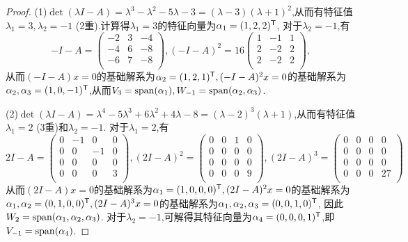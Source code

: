 \documentclass[11pt]{article}
\begin{document}
\begin{proof}
    (1)$\det(\lambda I-A)=\lambda^3-\lambda^2-5 \lambda-3=(\lambda-3) (\lambda+1)^2$,从而有特征值$\lambda_1=3, \lambda_2=-1$ (2重).计算得$\lambda_1=3$的特征向量为$\alpha_1=(1,2,2)^{\mathsf{T}}$, 对于$\lambda_2=-1$,有
    $$-I-A=\begin{pmatrix} 
        -2 & 3 & -4 \\
        -4 & 6 & -8 \\
        -6 & 7 & -8 \\
    \end{pmatrix}, (-I-A)^2=16\begin{pmatrix}
        1 & -1 & 1 \\
        2 & -2 & 2 \\
        2 & -2 & 2 \\
    \end{pmatrix},$$
    从而$(-I-A)x=0$的基础解系为$\alpha_2=(1,2,1)^{\mathsf{T}}, (-I-A)^2 x=0$的基础解系为$\alpha_2, \alpha_3=(1,0,-1)^{\mathsf{T}}$,从而$V_3=\mathrm{span}(\alpha_1), W_{-1}=\mathrm{span}(\alpha_2,\alpha_3)$.

    (2)$\det(\lambda I-A)=\lambda^4-5 \lambda^3+6 \lambda^2+4 \lambda-8=(\lambda-2)^3 (\lambda+1)$,从而有特征值$\lambda_1=2$ (3重)和$\lambda_2=-1$. 对于$\lambda_1=2$,有
    $$2I-A=\begin{pmatrix}
        0 & -1 & 0 & 0 \\
        0 & 0 & -1 & 0 \\
        0 & 0 & 0 & 0 \\
        0 & 0 & 0 & 3 \\
    \end{pmatrix}, (2I-A)^2=\begin{pmatrix}
        0 & 0 & 1 & 0 \\
        0 & 0 & 0 & 0 \\
        0 & 0 & 0 & 0 \\
        0 & 0 & 0 & 9 \\
    \end{pmatrix}, (2I-A)^3=\begin{pmatrix}
        0 & 0 & 0 & 0 \\
        0 & 0 & 0 & 0 \\
        0 & 0 & 0 & 0 \\
        0 & 0 & 0 & 27 \\
    \end{pmatrix}$$
    从而$(2I-A)x=0$的基础解系为$\alpha_1=(1,0,0,0)^{\mathsf{T}}, (2I-A)^2x=0$的基础解系为$\alpha_1, \alpha_2=(0,1,0,0)^{\mathsf{T}}, (2I-A)^3x=0$的基础解系为$\alpha_1, \alpha_2, \alpha_3=(0,0,1,0)^{\mathsf{T}}$, 因此$W_{2}=\mathrm{span}(\alpha_1,\alpha_2,\alpha_3)$. 对于$\lambda_2=-1$,可解得其特征向量为$\alpha_4=(0,0,0,1)^{\mathsf{T}}$,即$V_{-1}=\mathrm{span}(\alpha_4)$.
\end{proof}
\end{document}
